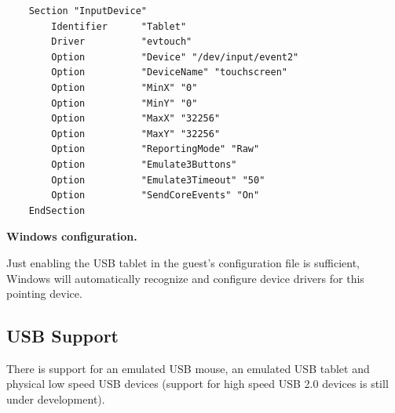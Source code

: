\documentclass[11pt,twoside,final,openright]{report}
\begin{document}
\begin{description}
{\small
\begin{verbatim}
    Section "InputDevice"
        Identifier      "Tablet"
        Driver          "evtouch"
        Option          "Device" "/dev/input/event2"
        Option          "DeviceName" "touchscreen"
        Option          "MinX" "0"
        Option          "MinY" "0"
        Option          "MaxX" "32256"
        Option          "MaxY" "32256"
        Option          "ReportingMode" "Raw"
        Option          "Emulate3Buttons"
        Option          "Emulate3Timeout" "50"
        Option          "SendCoreEvents" "On"
    EndSection
\end{verbatim}
}

\textbf{Windows configuration.}

Just enabling the USB tablet in the
guest's configuration file is sufficient,
Windows will automatically recognize and
configure device drivers for this
pointing device.

\end{description}

\subsection{USB Support}
There is support for an emulated USB mouse,
an emulated USB tablet
and physical low speed USB devices
(support for high speed USB 2.0 devices is
still under development).
\end{document}

